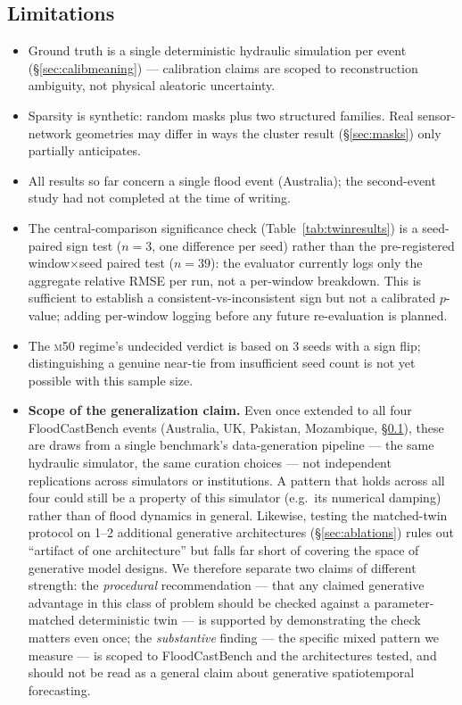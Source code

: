 \documentclass[11pt]{article}
\newcommand{\mfifty}{\textsc{m50}}
\begin{document}
\subsection{Limitations}
\label{sec:limitations}
\begin{itemize}
  \item Ground truth is a single deterministic hydraulic simulation per
    event (\S\ref{sec:calibmeaning}) --- calibration claims are scoped to
    reconstruction ambiguity, not physical aleatoric uncertainty.
  \item Sparsity is synthetic: random masks plus two structured families.
    Real sensor-network geometries may differ in ways the cluster result
    (\S\ref{sec:masks}) only partially anticipates.
  \item All results so far concern a single flood event (Australia); the
    second-event study had not completed at the time of writing.
  \item The central-comparison significance check (Table~\ref{tab:twinresults})
    is a seed-paired sign test ($n{=}3$, one difference per seed) rather
    than the pre-registered window$\times$seed paired test ($n{=}39$):
    the evaluator currently logs only the aggregate relative RMSE per
    run, not a per-window breakdown. This is sufficient to establish a
    consistent-vs-inconsistent sign but not a calibrated $p$-value; adding
    per-window logging before any future re-evaluation is planned.
  \item The \mfifty{} regime's undecided verdict is based on 3 seeds
    with a sign flip; distinguishing a genuine near-tie from insufficient
    seed count is not yet possible with this sample size.
  \item \textbf{Scope of the generalization claim.} Even once extended to
    all four FloodCastBench events (Australia, UK, Pakistan, Mozambique,
    \S\ref{sec:limitations}), these are draws from a single benchmark's
    data-generation pipeline --- the same hydraulic simulator, the same
    curation choices --- not independent replications across simulators
    or institutions. A pattern that holds across all four could still be
    a property of this simulator (e.g.\ its numerical damping) rather than
    of flood dynamics in general. Likewise, testing the matched-twin
    protocol on 1--2 additional generative architectures
    (\S\ref{sec:ablations}) rules out ``artifact of one architecture'' but
    falls far short of covering the space of generative model designs. We
    therefore separate two claims of different strength: the
    \emph{procedural} recommendation --- that any claimed generative
    advantage in this class of problem should be checked against a
    parameter-matched deterministic twin --- is supported by demonstrating
    the check matters even once; the \emph{substantive} finding --- the
    specific mixed pattern we measure --- is scoped to FloodCastBench and
    the architectures tested, and should not be read as a general claim
    about generative spatiotemporal forecasting.
\end{itemize}
\end{document}
